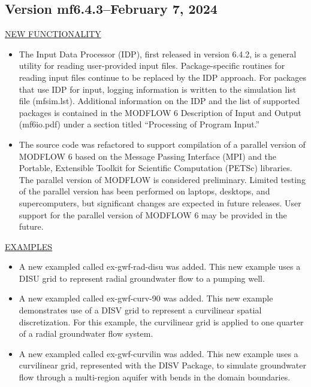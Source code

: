 	
	\subsection{Version mf6.4.3--February 7, 2024}

	\underline{NEW FUNCTIONALITY}
	\begin{itemize}
		\item The Input Data Processor (IDP), first released in version 6.4.2, is a general utility for reading user-provided input files.  Package-specific routines for reading input files continue to be replaced by the IDP approach.  For packages that use IDP for input, logging information is written to the simulation list file (mfsim.lst).  Additional information on the IDP and the list of supported packages is contained in the MODFLOW 6 Description of Input and Output (mf6io.pdf) under a section titled ``Processing of Program Input.''
		\item The source code was refactored to support compilation of a parallel version of MODFLOW 6 based on the Message Passing Interface (MPI) and the Portable, Extensible Toolkit for Scientific Computation (PETSc) libraries.  The parallel version of MODFLOW is considered preliminary. Limited testing of the parallel version has been performed on laptops, desktops, and supercomputers, but significant changes are expected in future releases. User support for the parallel version of MODFLOW 6 may be provided in the future.
	\end{itemize}

	\underline{EXAMPLES}
	\begin{itemize}
		\item A new exampled called ex-gwf-rad-disu was added.  This new example uses a DISU grid to represent radial groundwater flow to a pumping well.
		\item A new exampled called ex-gwf-curv-90 was added.  This new example demonstrates use of a DISV grid to represent a curvilinear spatial discretization.  For this example, the curvilinear grid is applied to one quarter of a radial groundwater flow system.
		\item A new exampled called ex-gwf-curvilin was added.  This new example uses a curvilinear grid, represented with the DISV Package, to simulate groundwater flow through a multi-region aquifer with bends in the domain boundaries.
	\end{itemize}

